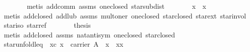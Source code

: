 \begin{isabellebody}
\ \ \ \ \ \ \isamarkupfalse%
\ {}metis\ add{}comm\ assms\ one{}closed\ star{}subdist{}\isanewline
\ \ \ \ \isamarkupfalse%
\ \isamarkupfalse%
\ {}{}{}{}x{}\ {}\ x\isanewline
\ \ \ \ \ \ \isamarkupfalse%
\ {}metis\ add{}closed\ add{}lub\ assms\ mult{}oner\ one{}closed\ star{}closed\ star{}ext\ star{}invol\ star{}iso\ star{}ref{}\isanewline
\ \ \ \ \isamarkupfalse%
\ \isamarkupfalse%
\ {}thesis\isanewline
\ \ \ \ \ \ \isamarkupfalse%
\ {}metis\ add{}closed\ assms\ nat{}antisym\ one{}closed\ star{}closed{}\isanewline
\ \ \isamarkupfalse%
%
\endisatagproof
{\isafoldproof}%
%
\isadelimproof
\isanewline
%
\endisadelimproof
\isanewline
\ \ \isamarkupfalse%
\ star{}unfoldl{}eq{}\ \ xc{}\ {}x\ {}\ carrier\ A{}\ \ {}x\ {}\ {}{}x{}x\isanewline

\end{isabellebody}
